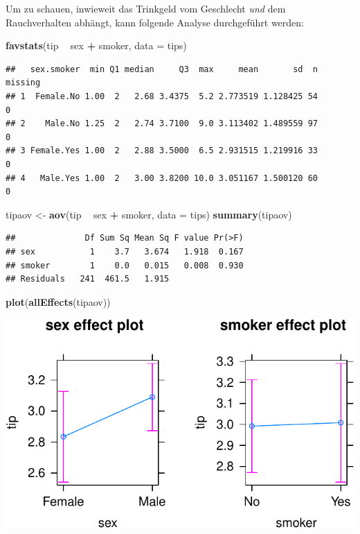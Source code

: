 \documentclass[12pt,ngerman,paper=a4,pagesize,DIV=13]{scrreprt}
\newenvironment{Shaded}{\begin{snugshade}}{\end{snugshade}}
\newcommand{\DataTypeTok}[1]{\textcolor[rgb]{0.13,0.29,0.53}{#1}}
\newcommand{\KeywordTok}[1]{\textcolor[rgb]{0.13,0.29,0.53}{\textbf{#1}}}
\newcommand{\NormalTok}[1]{#1}
\newcommand{\OperatorTok}[1]{\textcolor[rgb]{0.81,0.36,0.00}{\textbf{#1}}}
\newcommand{\StringTok}[1]{\textcolor[rgb]{0.31,0.60,0.02}{#1}}
\begin{document}
Um zu schauen, inwieweit das Trinkgeld vom Geschlecht \emph{und} dem
Rauchverhalten abhängt, kann folgende Analyse durchgeführt werden:

\begin{Shaded}
\begin{Highlighting}[]
\KeywordTok{favstats}\NormalTok{(tip }\OperatorTok{~}\StringTok{ }\NormalTok{sex }\OperatorTok{+}\StringTok{ }\NormalTok{smoker, }\DataTypeTok{data =}\NormalTok{ tips)}
\end{Highlighting}
\end{Shaded}

\begin{verbatim}
##   sex.smoker  min Q1 median     Q3  max     mean       sd  n missing
## 1  Female.No 1.00  2   2.68 3.4375  5.2 2.773519 1.128425 54       0
## 2    Male.No 1.25  2   2.74 3.7100  9.0 3.113402 1.489559 97       0
## 3 Female.Yes 1.00  2   2.88 3.5000  6.5 2.931515 1.219916 33       0
## 4   Male.Yes 1.00  2   3.00 3.8200 10.0 3.051167 1.500120 60       0
\end{verbatim}

\begin{Shaded}
\begin{Highlighting}[]
\NormalTok{tipaov <-}\StringTok{ }\KeywordTok{aov}\NormalTok{(tip }\OperatorTok{~}\StringTok{ }\NormalTok{sex }\OperatorTok{+}\StringTok{ }\NormalTok{smoker, }\DataTypeTok{data =}\NormalTok{ tips)}
\KeywordTok{summary}\NormalTok{(tipaov)}
\end{Highlighting}
\end{Shaded}

\begin{verbatim}
##              Df Sum Sq Mean Sq F value Pr(>F)
## sex           1    3.7   3.674   1.918  0.167
## smoker        1    0.0   0.015   0.008  0.930
## Residuals   241  461.5   1.915
\end{verbatim}

\begin{Shaded}
\begin{Highlighting}[]
\KeywordTok{plot}\NormalTok{(}\KeywordTok{allEffects}\NormalTok{(tipaov))}
\end{Highlighting}
\end{Shaded}

\includegraphics{DatenerhebungStatistik-Uebung_files/figure-latex/unnamed-chunk-155-1.pdf}
\end{document}
